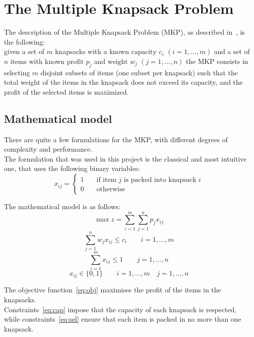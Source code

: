 \chapter{The Multiple Knapsack Problem}
The description of the Multiple Knapsack Problem (MKP), as described in~\cite{mkp:2019}, is the following:\\
given a set of \(m\) knapsacks with a known \(\text{capacity } c_{i}\) \((i=1,\dots,m)\) and a set of \(n\) items with
known \(\text{profit } p_{j}\) and \(\text{weight } w_{j}\) \((j=1,\dots,n)\) the MKP consists in
selecting \(m\) disjoint subsets of items (one subset per knapsack) such that the total weight of the items in the knapsack
does not exceed its capacity, and the profit of the selected items is maximized.

\section{Mathematical model}
There are quite a few formulations for the MKP, with different degrees of
complexity and performance.\\
The formulation that was used in this project is the classical and most intuitive
one, that uses the following binary variables:
\[x_{ij}=
\begin{cases}
    1 & \quad \text{if item } j \text{ is packed into knapsack } i\\
    0 & \quad \text{otherwise}
\end{cases}
\]

The mathematical model is as follows:
\begin{equation}
    \label{eq:obj}
    \max{z} = \sum_{i=1}^{m} \sum_{j=1}^{n} p_{j} x_{ij}
\end{equation}
\begin{equation}
    \label{eq:cap}
    \sum_{j=1}^{n} w_{j} x_{ij} \leq c_{i} \qquad i=1,\dots,m
\end{equation}
\begin{equation}
    \label{eq:sel}
    \sum_{i=1}^{m} x_{ij} \leq 1 \qquad j=1,\dots,n
\end{equation}
\begin{equation}
    x_{ij} \in \{0,1\} \qquad i=1,\dots,m \quad j=1,\dots,n
\end{equation}

The objective function~\eqref{eq:obj} maximises the profit of the items in the knapsacks.\\
Constraints~\eqref{eq:cap} impose that the capacity of each knapsack is respected, while constraints~\eqref{eq:sel}
ensure that each item is packed in no more than one knapsack.

